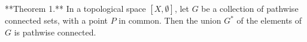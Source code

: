 **Theorem 1.** In a topological space $[X, \emptyset]$, let $G$ be a collection of pathwise connected sets, with a point $P$ in common. Then the union $G^*$ of the elements of $G$ is pathwise connected.

